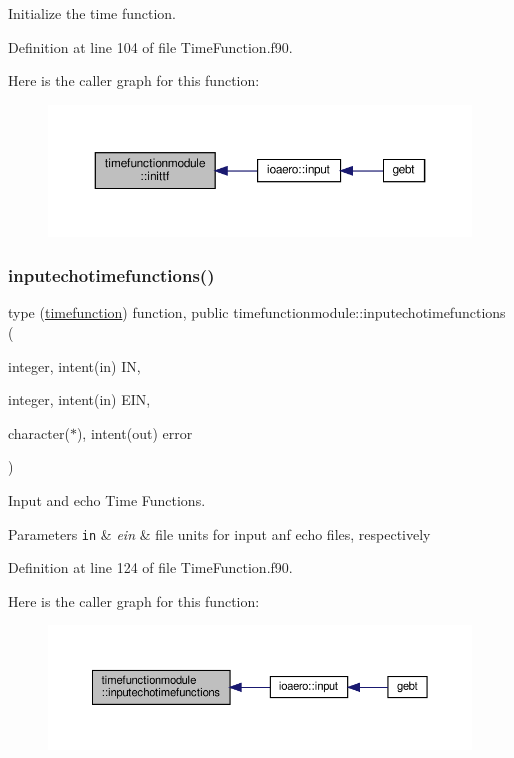 Initialize the time function. 



Definition at line 104 of file Time\+Function.\+f90.

Here is the caller graph for this function\+:\nopagebreak
\begin{figure}[H]
\begin{center}
\leavevmode
\includegraphics[width=350pt]{namespacetimefunctionmodule_a4a9a0cfa8fd5fc6dcfd21c0eeed2a027_icgraph}
\end{center}
\end{figure}
\mbox{\label{namespacetimefunctionmodule_a9dc9317deeac617a45cf48f6101f11d2}} 
\subsubsection{\texorpdfstring{inputechotimefunctions()}{inputechotimefunctions()}}
{\footnotesize\ttfamily type (\hyperlink{structtimefunctionmodule_1_1timefunction}{timefunction}) function, public timefunctionmodule\+::inputechotimefunctions (\begin{DoxyParamCaption}\item[{integer, intent(in)}]{IN,  }\item[{integer, intent(in)}]{E\+IN,  }\item[{character($\ast$), intent(out)}]{error }\end{DoxyParamCaption})}



Input and echo Time Functions. 


\begin{DoxyParams}[1]{Parameters}
\mbox{\tt in}  & {\em ein} & file units for input anf echo files, respectively \\
\hline
\end{DoxyParams}


Definition at line 124 of file Time\+Function.\+f90.

Here is the caller graph for this function\+:\nopagebreak
\begin{figure}[H]
\begin{center}
\leavevmode
\includegraphics[width=350pt]{namespacetimefunctionmodule_a9dc9317deeac617a45cf48f6101f11d2_icgraph}
\end{center}
\end{figure}

